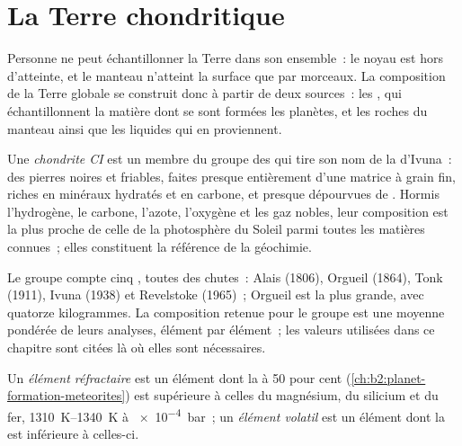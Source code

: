 \section{La Terre chondritique}

Personne ne peut échantillonner la Terre dans son ensemble~: le noyau est
hors d'atteinte, et le manteau n'atteint la surface que par morceaux. La
composition de la Terre globale se construit donc à partir de deux sources~:
les , qui échantillonnent la matière dont se sont formées les
planètes, et les roches du manteau ainsi que les liquides qui en proviennent.

\begin{definition}[chondrite CI]\label{def:b2:elements-in-the-earth:ci}
Une \emph{chondrite CI} est un membre du groupe des 
qui tire son nom de la  d'Ivuna~: des pierres noires et friables, faites
presque entièrement d'une matrice à grain fin, riches en minéraux hydratés et en carbone,
et presque dépourvues de . Hormis l'hydrogène, le carbone, l'azote, l'oxygène
et les gaz nobles, leur composition est la plus proche de celle de la photosphère du
Soleil parmi toutes les matières connues~; elles constituent la référence de la géochimie.
\end{definition}

Le groupe compte cinq , toutes des chutes~: Alais (1806), Orgueil
(1864), Tonk (1911), Ivuna (1938) et Revelstoke (1965)~; Orgueil est la
plus grande, avec quatorze kilogrammes. La composition retenue pour le groupe
est une moyenne pondérée de leurs analyses, élément par élément~; les
valeurs utilisées dans ce chapitre sont citées là où elles sont nécessaires.

\begin{definition}
\label{def:b2:elements-in-the-earth:volatility}
Un \emph{élément réfractaire} est un
élément dont la  à 50 pour cent
(\cref{ch:b2:planet-formation-meteorites}) est supérieure à celles du magnésium,
du silicium et du fer, \qtyrange{1310}{1340}{K} à \qty{e-4}{bar}~;
un \emph{élément volatil} est un élément
dont la  est inférieure à celles-ci.
\end{definition}


